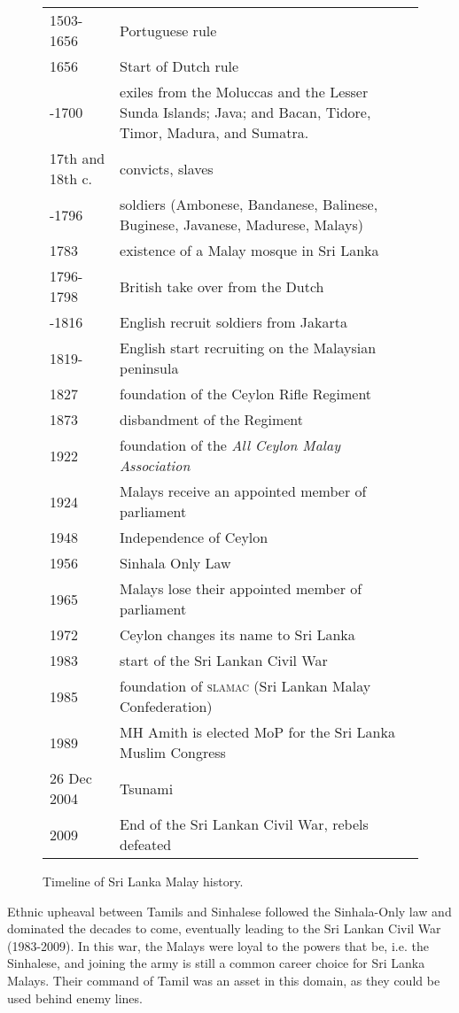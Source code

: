 \begin{figure}
\begin{tabular}{lp{10cm}}
1503-1656& Portuguese rule \\
1656 & Start of Dutch rule  \\
-1700 & exiles from the Moluccas and the Lesser Sunda Islands; Java; and Bacan, Tidore, Timor, Madura, and Sumatra.  \\
17th and 18th c. & convicts, slaves \\
-1796 & soldiers (Ambonese, Bandanese, Balinese, Buginese, Javanese, Madurese, Malays)\\
1783 & existence of a Malay mosque in Sri Lanka\\
1796-1798 & British take over from the Dutch \\
-1816 & English recruit soldiers from Jakarta\\
1819- & English start recruiting on the Malaysian peninsula\\
1827 & foundation of the Ceylon Rifle Regiment \\
1873 & disbandment of the Regiment \\
1922 & foundation of the \textit{All Ceylon Malay Association}\\
1924 & Malays receive an appointed member of parliament \\
1948 & Independence of Ceylon\\
1956 & Sinhala Only Law\\
1965 & Malays lose their appointed member of parliament\\
1972 & Ceylon changes its name to Sri Lanka\\
1983 & start of the Sri Lankan Civil War \\
1985 & foundation of \textsc{slamac} (Sri Lankan Malay Confederation)\\
1989 & MH Amith is elected MoP for the Sri Lanka Muslim Congress \\
26 Dec 2004 & Tsunami \\
2009 & End of the Sri Lankan Civil War, rebels defeated\\
\end{tabular}
 \caption{Timeline of Sri Lanka Malay history.} 
\end{figure}


Ethnic upheaval between Tamils and Sinhalese followed the Sinhala-Only law and dominated the decades to come, eventually leading to the Sri Lankan Civil War (1983-2009). In this war, the Malays were loyal to the powers that be, i.e. the Sinhalese, and joining the army is still a common career choice for Sri Lanka Malays. Their command of Tamil was an asset in this domain, as they could be used behind enemy lines.

